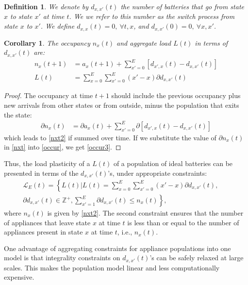 \documentclass[10pt]{IEEEtran}
\newtheorem{corollary}[theorem]{Corollary}
\newtheorem{definition}[theorem]{Definition}
\begin{document}
\begin{definition}{\it  We denote by $d_{x,x'}(t)$ the number of batteries that go from state $x$ to state $x'$ at time $t$. We we refer to this number as the {\it switch process from state $x$ to $x'$}. We define $d_{x,x}(t) = 0, ~\forall t,x$, and $d_{x,x'}(0) = 0,~\forall x,x'$.}
\end{definition}
\begin{corollary}{\it
The occupancy $n_x(t)$ and aggregate load $L(t)$ in terms of $d_{x,x'}(t)$ are: }
\begin{align}\label{nxt2}
n_{x}(t+1)&=  a_x(t+1) + \sum_{x' = 0}^E [d_{x',x}(t)- d_{x,x'}(t)]
\\\label{occur3}
L(t) &= \sum_{x=0}^E \sum_{x'=0}^E (x'-x)\partial d_{x,x'}(t)
\end{align}
\end{corollary}
\begin{proof}
The occupancy at time $t+1$ should include the previous occupancy plus new arrivals from other states or from outside, minus the population that exits the state:
\begin{align}\label{nxt}
\partial n_{x}(t)&=\partial a_x(t) + \sum_{x' = 0}^E \partial [d_{x',x}(t)-d_{x,x'}(t)]
\end{align}
which leads to \eqref{nxt2} if summed over time. If we substitute the value of $\partial n_x(t)$ in \eqref{nxt} into \eqref{occur}, we get \eqref{occur3}.\end{proof}
Thus, the load plasticity of a $L(t)$ of a population of ideal batteries can be presented in terms of the $d_{x,x'}(t)$'s, under appropriate constraints:
  \begin{eqnarray}\nonumber
{\mathcal L}_E(t) = \left\{L(t) |  L(t) = \sum_{x=0}^E \sum_{x'=0}^E (x'-x)\partial d_{x,x'}(t), \right. &&\\ \left.\partial d_{x,x'}(t) \in \mathbb{Z}^+, \sum_{x' = 1}^{E}\partial d_{x,x'}(t) \leq n_x(t)\right\},&&\label{occur4}
\end{eqnarray}
where $n_x(t)$ is given by \eqref{nxt2}. The second constraint ensures that the number of appliances that leave  state $x$ at time $t$ is less than or equal to the number of appliances present in state $x$ at time $t$, i.e., $n_x(t)$.





One advantage of aggregating constraints for appliance populations into one model is that 
integrality constraints on $d_{x,x'}(t)$'s can be safely relaxed at large scales. This makes the population model linear and less computationally expensive.
\end{document}
